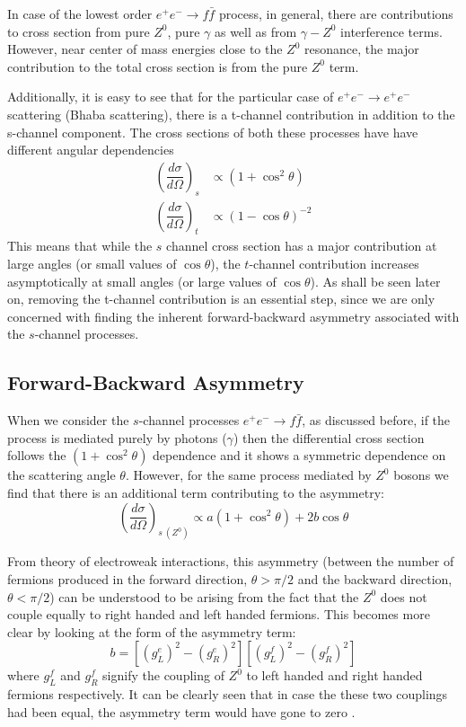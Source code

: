 In case of the lowest order $e^{+}e^{-}\rightarrow f \bar{f}$ process, in general, there are contributions to cross section from pure $Z^{0}$, pure $\gamma$ as well as from $\gamma - Z^{0}$ interference terms. However, near center of mass energies close to the $Z^{0}$ resonance, the major contribution to the total cross section is from the pure $Z^{0}$ term.

Additionally, it is easy to see that for the particular case of $e^{+}e^{-}\rightarrow e^{+}e^{-}$ scattering (Bhaba scattering), there is a t-channel contribution in addition to the s-channel component. The cross sections of both these processes have have different angular dependencies \cite{UB}
\begin{align}
\left(\dfrac{d\sigma}{d\Omega}\right)_{s}&\propto (1+\cos^{2}\theta)\\
\left(\dfrac{d\sigma}{d\Omega}\right)_{t}&\propto (1-\cos\theta)^{-2}
\end{align}
This means that while the $s$ channel cross section has a major contribution at large angles (or small values of $\cos\theta$), the $t$-channel contribution increases asymptotically at small angles (or large values of $\cos\theta$). As shall be seen later on, removing the t-channel contribution is an essential step, since we are only concerned with finding the inherent forward-backward asymmetry associated with the $s$-channel processes.

\subsection{Forward-Backward Asymmetry}
\label{FBasymm}
When we consider the $s$-channel processes $e^{+}e^{-}\rightarrow f\bar{f}$, as discussed before, if the process is mediated purely by photons ($\gamma$) then the differential cross section follows the $(1+\cos^{2}\theta)$ dependence and it shows a symmetric dependence on the scattering angle $\theta$. However, for the same process mediated by $Z^{0}$ bosons we find that there is an additional term contributing to the asymmetry:
\begin{equation}
\left(\dfrac{d\sigma}{d\Omega}\right)_{s\ (Z^{0})}\propto a(1+\cos^{2}\theta) + 2b\cos\theta
\end{equation}

From theory of electroweak interactions, this asymmetry (between the number of fermions produced in the forward direction, $\theta>\pi /2$ and the backward direction, $\theta<\pi /2$) can be understood to be arising from the fact that the $Z^{0}$ does not couple equally to right handed and left handed fermions. This becomes more clear by looking at the form of the asymmetry term:
\begin{equation}
b=\left[\left(g_{L}^{e}\right)^{2}-\left(g_{R}^{e}\right)^{2}\right]\left[\left(g_{L}^{f}\right)^{2}-\left(g_{R}^{f}\right)^{2}\right]
\end{equation}
where $g_{L}^{f}$ and $g_{R}^{f}$ signify the coupling of $Z^{0}$ to left handed and right handed fermions respectively. It can be clearly seen that in case the these two couplings had been equal, the asymmetry term would have gone to zero \cite{thomson_2013}.


